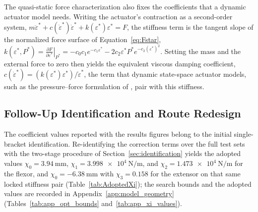 The quasi-static force characterization also fixes the coefficients that a dynamic actuator model needs. Writing the actuator's contraction as a second-order system, $m\ddot \varepsilon^* + c (\dot \varepsilon^* ) \dot \varepsilon^* + k ( \varepsilon^* ) \varepsilon^* = F$, the stiffness term is the tangent slope of the normalized force surface of Equation~\eqref{eq:Fstar}, $k(\varepsilon^{*}, P^{*})
= \left.\frac{\partial F}{\partial \varepsilon^{*}}\right|_{P^{*}}
= -c_{0}c_{1}e^{-c_{1}\varepsilon^{*}}
  - 2c_{2}\varepsilon^{*}P^{*}e^{-c_{2}(\varepsilon^{*})^{2}}$. Setting the mass and the external force to zero then yields the equivalent viscous damping coefficient, $c (\dot \varepsilon^* ) = (k ( \varepsilon^* ) \varepsilon^*)/\dot \varepsilon^*$, the term that dynamic state-space actuator models, such as the pressure--force formulation of \citet{elzein_pressure_2025}, pair with this stiffness.

\subsection{Follow-Up Identification and Route Redesign}\label{sec:ongoing}

The coefficient values reported with the results figures belong to the initial single-bracket identification. Re-identifying the correction terms over the full test sets with the two-stage procedure of Section~\ref{sec:identification} yields the adopted values $\chi_{0} = \qty{+3.94}{\mm}$, $\chi_{1} = \qty{3.998e4}{\N\per\m}$, and $\chi_{2} = \qty{1.473e4}{\N\per\m}$ for the flexor, and $\chi_{0} = \qty{-6.38}{\mm}$ with $\chi_{3} = 0.158$ for the extensor on that same locked stiffness pair (Table~\ref{tab:AdoptedXi}); the search bounds and the adopted values are recorded in Appendix~\ref{app:model_geometry} (Tables~\ref{tab:app_opt_bounds} and~\ref{tab:app_xi_values}).

